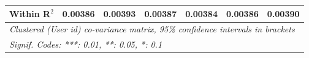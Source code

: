 \begin{table}[htbp]
\begin{threeparttable}[b]
\begin{tabular}{lcccccc}
         Within R$^2$               & 0.00386          & 0.00393          & 0.00387          & 0.00384          & 0.00386          & 0.00390\\  
         \midrule \midrule
         \multicolumn{7}{l}{\emph{Clustered (User id) co-variance matrix, 95\% confidence intervals in brackets}}\\
         \multicolumn{7}{l}{\emph{Signif. Codes: ***: 0.01, **: 0.05, *: 0.1}}\\
      \end{tabular}
   \end{threeparttable}
\end{table}


